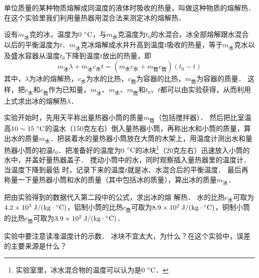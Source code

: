 单位质量的某种物质熔解成同温度的液体时吸收的热量，叫做这种物质的熔解热．在这个实验里我们利用量热器用混合法来测定冰的熔解热．

设有$m_{\text{冰}}$克的冰，温度为0$\;{}^\circ\text{C}$，与$m_{\text{水}}$克温度为$t_0$的水混合，冰全部熔解跟水混合以后的平衡温度为$t$．$m_{\text{冰}}$克冰熔解成水并升高到温度$t$吸收的热量，等于$m_{\text{水}}$克水以及盛水容器从温度$t_0$下降到温度$t$放出的热量，即
\[m_{\text{冰}}\lambda+m_{\text{冰}}c_{\text{水}}t=(m_{\text{水}}c_{\text{水}}+m_{\text{筒}}c_{\text{筒}})(t_0-t)  \]
其中，$\lambda$为冰的熔解热，$c_{\text{水}}$为水的比热，$c_{\text{筒}}$为容器的比热，$m_{\text{筒}}$为容器的质量．
这样，把$c_{\text{水}}$和$c_{\text{筒}}$作为已知量，$m_{\text{冰}}$、$m_{\text{水}}$、$m_{\text{筒}}$和$t_0$、$t$都可以由实验获得，从而利用上式求出冰的熔解热$\lambda$．

实验开始时，先用天平称出量热器小筒的质量$m_{\text{筒}}$（包括搅拌器）．
然后把比室温高$10 \sim 15 \;{}^\circ\text{C} $的温水（150克左右）倒入量热器小筒，再称出水和小筒的质量，算出水的质量$m_{\text{水}}$．把装着水的量热器小筒放在大筒的木架上，用温度计测出水和量热器小筒的初温$t_0$．把准备好的温度为0$\;{}^\circ\text{C}$的冰块\footnote{实验室里，冰水混合物的温度可以认为是0$\;{}^\circ\text{C}$．}（20克左右）迅速放入小筒的水中，并盖好量热器盖子．
搅动小筒中的水，同时观察插入量热器里的温度计．
当温度下降到最低
时，记录下来的温度$t$就是冰、水混合后的平衡温度．
最后再称量一下量热器小筒和水的质量（其中包括冰的质量），算出冰的质量$m_{\text{冰}}$．

把由实验得到的数据代入第二段中的公式，求出冰的熔
解热．
水的比热$c_{\text{水}}$可取为$4.2\times10^3\;\text{J}/(\text{kg}\cdot{}^\circ\text{C}) $，铝制小筒的比热$c_{\text{筒}}$可取为$8.9\times10^2  \;\text{J}/(\text{kg}\cdot{}^\circ\text{C}) $，铜制小筒的比热$c_{\text{筒}}$可取为$3.9\times10^2 \;\text{J}/(\text{kg}\cdot{}^\circ\text{C}) $．

实验中要注意读准温度计的示数．
冰块不宜太大，为什么？在这个实验中，误差的主要来源是什么？

